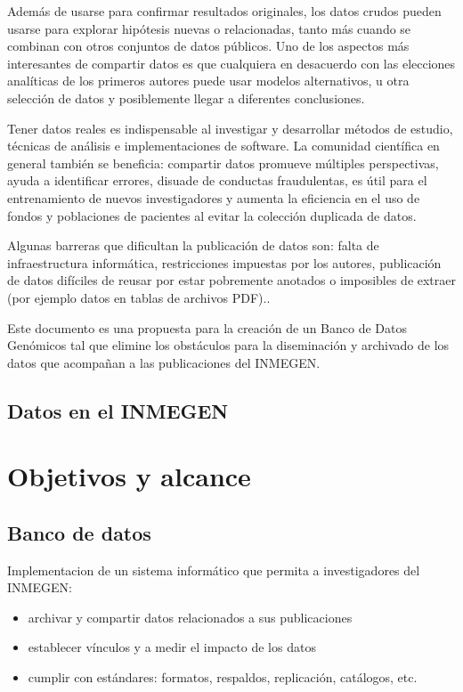\documentclass[
10pt, %
letterpaper, %
oneside, %
headinclude,footinclude, %
BCOR5mm, %
]{scrartcl}
\begin{document}
Además de usarse para confirmar resultados originales, los datos
crudos pueden usarse para explorar hipótesis nuevas o relacionadas,
tanto más cuando se combinan con otros conjuntos de datos públicos.
Uno de los aspectos más interesantes de compartir datos es que
cualquiera en desacuerdo con las elecciones analíticas de los primeros
autores puede usar modelos alternativos, u otra selección de datos y
posiblemente llegar a diferentes conclusiones.

Tener datos reales es indispensable al investigar y desarrollar
métodos de estudio, técnicas de análisis e implementaciones de
software. La comunidad científica en general también se beneficia:
compartir datos promueve múltiples perspectivas, ayuda a identificar
errores, disuade de conductas fraudulentas, es útil para el
entrenamiento de nuevos investigadores y aumenta la eficiencia en el
uso de fondos y poblaciones de pacientes al evitar la colección
duplicada de datos.\cite{piwowar_sharing_2007}

Algunas barreras que dificultan la publicación de datos son: falta de
infraestructura informática, restricciones impuestas por los autores,
publicación de datos difíciles de reusar por estar pobremente anotados
o imposibles de extraer (por ejemplo datos en tablas de archivos
PDF).\cite{molloy_open_2011}.

Este documento es una propuesta para la creación de un Banco de Datos
Genómicos tal que elimine los obstáculos para la diseminación y
archivado de los datos que acompañan a las publicaciones del INMEGEN.


\subsection{Datos en el INMEGEN}



\section{Objetivos y alcance}


\subsection{Banco de datos}

Implementacion de un sistema informático que permita a investigadores
del INMEGEN:
\begin{itemize}
\item archivar y compartir datos relacionados a sus publicaciones
\item establecer vínculos y a medir el impacto de los datos
\item cumplir con estándares: formatos, respaldos, replicación,
  catálogos, etc.
\end{itemize}
\end{document}
